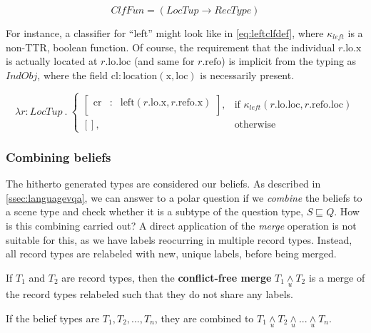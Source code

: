 \begin{equation}\label{eq:clf}
ClfFun = ( LocTup \rightarrow RecType )
\end{equation}

For instance, a classifier for ``left'' might look like in \autoref{eq:leftclfdef}, where $\kappa_{left}$ is a non-TTR, boolean function.
Of course, the requirement that the individual $r.\text{lo}.\text{x}$ is actually located at $r.\text{lo}.\text{loc}$ (and same for $r.\text{refo}$) is implicit from the typing as $IndObj$, where the field $\text{cl} : \text{location}(\text{x}, \text{loc})$ is necessarily present.

\begin{equation}\label{eq:leftclfdef}
\lambda r : LocTup \ .\ 
\begin{cases}
\left[\begin{array}{rcl}
    \text{cr} &:& \text{left}(r.\text{lo}.\text{x}, r.\text{refo}.\text{x}) \\
\end{array}\right],
& \text{if } \kappa_{left}(r.\text{lo}.\text{loc}, r.\text{refo}.\text{loc}) \\
[], & \text{otherwise}
\end{cases}
\end{equation}



\subsubsection{Combining beliefs}

The hitherto generated types are considered our beliefs.
As described in \autoref{ssec:languagevqa}, we can answer to a polar question if we \textit{combine} the beliefs to a scene type and check whether it is a subtype of the question type, $S \sqsubseteq Q$.
How is this combining carried out?
A direct application of the \textit{merge} operation is not suitable for this, as we have labels reocurring in multiple record types.
Instead, all record types are relabeled with new, unique labels, before being merged.

\label{def:cfmerge}
If $T_1$ and $T_2$ are record types, then the \textbf{conflict-free merge} $T_1 \underset{u}{\wedge} T_2$ is a merge of the record types relabeled such that they do not share any labels.

If the belief types are $T_1, T_2, ..., T_n$, they are combined to $T_1 \underset{u}{\wedge} T_2 \underset{u}{\wedge} ... \underset{u}{\wedge} T_n$.



